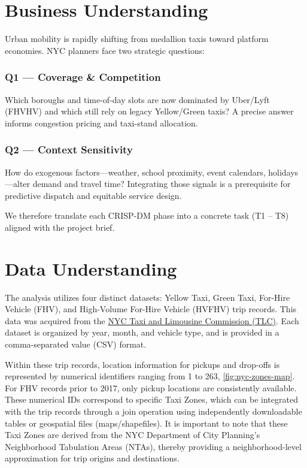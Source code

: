 \documentclass[conference]{IEEEtran}
\begin{document}
\section{Business Understanding}
Urban mobility is rapidly shifting from medallion taxis toward platform
economies.  NYC planners face two strategic questions:

\subsubsection*{Q1 — Coverage \& Competition}
Which boroughs and time-of-day slots are now dominated by Uber/Lyft
(FHVHV) and which still rely on legacy Yellow/Green taxis?  A precise
answer informs congestion pricing and taxi-stand allocation.

\subsubsection*{Q2 — Context Sensitivity}
How do exogenous factors—weather, school proximity, event calendars, holidays—alter demand and travel time?
Integrating those signals is a prerequisite for predictive dispatch and equitable service design.

We therefore translate each CRISP-DM phase into a concrete task
(T1 – T8) aligned with the project brief.


\section{Data Understanding}
The analysis utilizes four distinct datasets: Yellow Taxi, Green Taxi, For-Hire Vehicle (FHV), and High-Volume
For-Hire Vehicle (HVFHV) trip records. This data was acquired from the
\href{https://www.nyc.gov/site/tlc/about/tlc-trip-record-data.page}{NYC Taxi and Limousine Commission (TLC)}.
Each dataset is organized by year, month, and vehicle type, and is provided in a comma-separated value (CSV) format.

Within these trip records, location information for pickups and drop-offs is represented by numerical identifiers
ranging from 1 to 263, \ref{fig:nyc-zones-map}. For FHV records prior to 2017, only pickup locations are consistently
available. These numerical IDs correspond to specific Taxi Zones, which can be integrated with the trip records through
a join operation using independently downloadable tables or geospatial files (maps/shapefiles). It is important to note
that these Taxi Zones are derived from the NYC Department of City Planning's Neighborhood Tabulation Areas (NTAs),
thereby providing a neighborhood-level approximation for trip origins and destinations.
\end{document}
